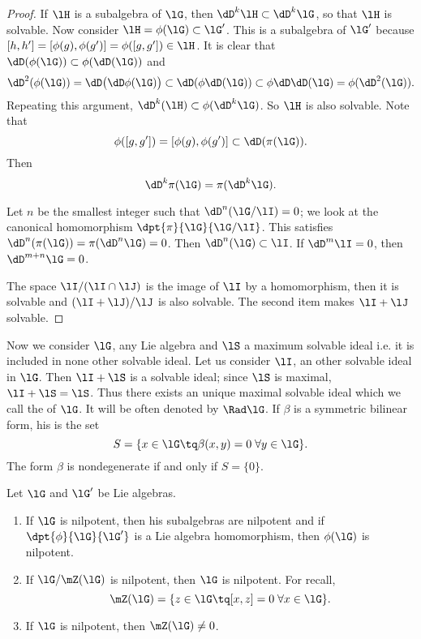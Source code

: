 \begin{proof}
	If $\lH$ is a subalgebra of $\lG$, then $\dD^k\lH\subset\dD^k\lG$, so that $\lH$ is solvable. Now consider $\lH=\phi(\lG)\subset\lG'$. This is a subalgebra of $\lG'$ because $[h,h']=[\phi(g),\phi(g')]=\phi([g,g'])\in\lH$. It is clear that $\dD(\phi(\lG))\subset\phi(\dD(\lG))$ and
	\begin{equation}
		\dD^2(\phi(\lG))=\dD\big( \dD\phi(\lG) \big)
		\subset\dD(\phi\dD(\lG))
		\subset\phi\dD\dD(\lG)
		=\phi(\dD^2(\lG)).
	\end{equation}
	Repeating this argument, $\dD^k(\lH)\subset\phi(\dD^k\lG)$. So $\lH$ is also solvable. Note that
	\begin{equation}
		\phi([g,g'])=[\phi(g),\phi(g')]\subset\dD(\pi(\lG)).
	\end{equation}
	Then
	\begin{equation}
		\dD^k\pi(\lG)=\pi(\dD^k\lG).
	\end{equation}

	Let $n$ be the smallest integer such that $\dD^n(\lG/\lI)=0$; we look at the canonical homomorphism $\dpt{\pi}{\lG}{\lG/\lI}$. This satisfies $\dD^n(\pi(\lG))=\pi(\dD^n\lG)=0$. Then $\dD^n(\lG)\subset\lI$. If $\dD^m\lI=0$, then $\dD^{m+n}\lG=0$.

	The space $\lI/(\lI\cap\lJ)$ is the image of $\lI$ by a homomorphism, then it is solvable and $(\lI+\lJ)/\lJ$ is also solvable. The second item makes $\lI+\lJ$ solvable.
\end{proof}

Now we consider $\lG$, any Lie algebra and $\lS$ a maximum solvable ideal i.e. it is included in none other solvable ideal. Let us consider $\lI$, an other solvable ideal in $\lG$. Then $\lI+\lS$ is a solvable ideal; since $\lS$ is maximal, $\lI+\lS=\lS$. Thus there exists an unique maximal solvable ideal which we call the  of $\lG$. It will be often denoted by $\Rad\lG$. If $\beta$ is a symmetric bilinear form, his  is the set
\begin{equation}
	S=\{x\in\lG\tq\beta(x,y)=0\;\forall y\in\lG\}.
\end{equation}
The form $\beta$ is nondegenerate if and only if $S=\{0\}$.

\begin{proposition}
	Let $\lG$ and $\lG'$ be Lie algebras.

	\begin{enumerate}
		\item If $\lG$ is nilpotent, then his subalgebras are nilpotent and if $\dpt{\phi}{\lG}{\lG'}$ is a Lie algebra homomorphism, then $\phi(\lG)$ is nilpotent.

		\item If $\lG/\mZ(\lG)$ is nilpotent, then $\lG$ is nilpotent. For recall,
		      \[
			      \mZ(\lG)=\{z\in\lG\tq [x,z]=0\;\forall x\in\lG\}.
		      \]

		\item If $\lG$ is nilpotent, then $\mZ(\lG)\neq 0$.
	\end{enumerate}
	\label{prop:nil_homom_nil}
\end{proposition}

